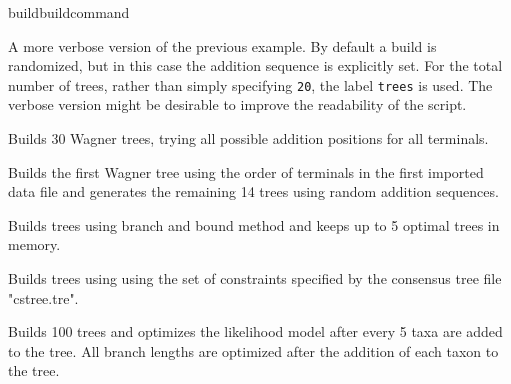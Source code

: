 \begin{command}{build}{buildcommand}
\begin{poyexamples}
            {A more verbose version of the previous example. By default a build
            is randomized, but in this case the addition sequence is explicitly
            set. For the total number of trees, rather than simply specifying \texttt{20},
            the label \texttt{trees} is used. The verbose version might be desirable
            to improve the readability of the script.}

            {Builds 30 Wagner trees, trying all possible addition positions for all terminals}.
            
            {Builds the first Wagner tree using the order of terminals in the first
            imported data file and generates the remaining
            14 trees using random addition sequences.}
            
            {Builds trees using branch and bound method and keeps up to
            5 optimal trees in memory.}
            
            {Builds trees using using the set of constraints specified by the consensus tree 
            file "cstree.tre".}
            
            {Builds 100 trees and optimizes the likelihood model after every 5 
            taxa are added to the tree.  All branch lengths are optimized after the addition 
            of each taxon to the tree.}
                    
	\end{poyexamples}

\end{command}


